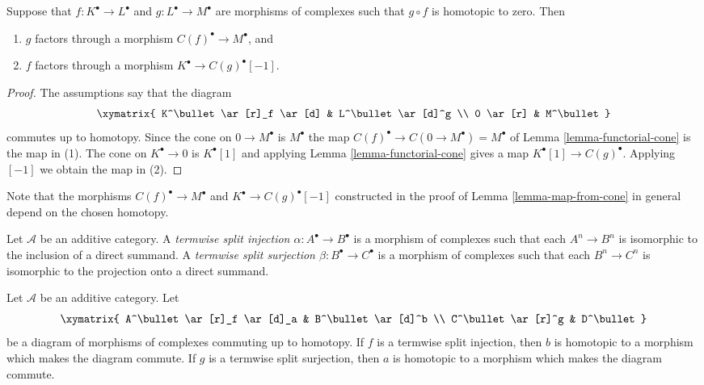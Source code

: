 \begin{lemma}
\label{lemma-map-from-cone}
Suppose that $f: K^\bullet \to L^\bullet$ and $g : L^\bullet \to M^\bullet$
are morphisms of complexes such that $g \circ f$ is homotopic to zero.
Then
\begin{enumerate}
\item $g$ factors through a morphism $C(f)^\bullet \to M^\bullet$, and
\item $f$ factors through a morphism $K^\bullet \to C(g)^\bullet[-1]$.
\end{enumerate}
\end{lemma}

\begin{proof}
The assumptions say that the diagram
$$
\xymatrix{
K^\bullet \ar[r]_f \ar[d] & L^\bullet \ar[d]^g \\
0 \ar[r] & M^\bullet
}
$$
commutes up to homotopy.
Since the cone on $0 \to M^\bullet$ is $M^\bullet$ the
map $C(f)^\bullet \to C(0 \to M^\bullet) = M^\bullet$
of Lemma \ref{lemma-functorial-cone}
is the map in (1). The cone on $K^\bullet \to 0$ is
$K^\bullet[1]$ and applying Lemma \ref{lemma-functorial-cone}
gives a map $K^\bullet[1] \to C(g)^\bullet$. Applying
$[-1]$ we obtain the map in (2).
\end{proof}

\noindent
Note that the morphisms $C(f)^\bullet \to M^\bullet$ and
$K^\bullet \to C(g)^\bullet[-1]$ constructed in the proof
of Lemma \ref{lemma-map-from-cone} in general depend on the
chosen homotopy.

\begin{definition}
\label{definition-termwise-split-map}
Let $\mathcal{A}$ be an additive category.
A {\it termwise split injection $\alpha : A^\bullet \to B^\bullet$}
is a morphism of complexes such that each $A^n \to B^n$
is isomorphic to the inclusion of a direct summand.
A {\it termwise split surjection $\beta : B^\bullet \to C^\bullet$}
is a morphism of complexes such that each $B^n \to C^n$
is isomorphic to the projection onto a direct summand.
\end{definition}

\begin{lemma}
\label{lemma-make-commute-map}
Let $\mathcal{A}$ be an additive category.
Let
$$
\xymatrix{
A^\bullet \ar[r]_f \ar[d]_a & B^\bullet \ar[d]^b \\
C^\bullet \ar[r]^g & D^\bullet
}
$$
be a diagram of morphisms of complexes commuting up to homotopy.
If $f$ is a termwise split injection, then $b$ is homotopic to a
morphism which makes the diagram commute.
If $g$ is a termwise split surjection, then $a$ is homotopic to a
morphism which makes the diagram commute.
\end{lemma}

